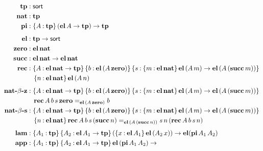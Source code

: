 \documentclass[11pt,twoside]{article}
\newcommand{\braces}[1]{\{#1\}}
\newcommand{\parens}[1]{(#1)}
\newcommand{\sortclass}{\ensuremath{\textsf{sort}}}
\newcommand{\eqclass}[3]{{#2}=_{#1}{#3}}
\newcommand{\piclass}[3]{\braces{{#2}\mathbin{:}{#1}}\,{#3}}
\newcommand{\arrclass}[2]{{#1}\to{#2}}
\newcommand{\appobj}[2]{{#1}\,{#2}}
\begin{document}
\begin{figure}
  
  \begin{align*}
    \tpsort
    & : \sortclass \\
    \nattp
    & : \tpsort \\
    \pitp
    & : \piclass{\tpsort}{A}{\arrclass{\parens{\arrclass{\elof{A}}{\tpsort}}}{\tpsort}} \\[1ex]
%
    \elfam 
    & : \arrclass{\tpsort}{\sortclass} \\
    \zerocon
    & : \elof{\nattp} \\
    \succcon
    & : \arrclass {\elof{\nattp}}{\elof{\nattp}} \\
    \reccon
    &  :
      \piclass{\arrclass{\elof{\nattp}}{\tpsort}}{A}{
      \piclass{\elofp{\appobj{A}{\zerocon}}}{b}{
      \piclass{\piclass{\elof{\nattp}}{m}{\arrclass{\elofp{\appobj{A}{m}}}{\elofp{\appobj{A}{\parens{\succof{m}}}}}}}{s}{
      }}} \\
    & \quad
      \piclass{\elof{\nattp}}{n}{\elofp{\appobj{A}{n}}} \\[1ex] 
%
    \natbetaz
    & :
      \piclass{\arrclass{\elof{\nattp}}{\tpsort}}{A}{
      \piclass{\elofp{\appobj{A}{\zerocon}}}{b}{
      \piclass{\piclass{\elof{\nattp}}{m}{\arrclass{\elofp{\appobj{A}{m}}}{\elofp{\appobj{A}{\parens{\succof{m}}}}}}}{s}{
      }}} \\
    & \quad
      \eqclass{\elofp{\appobj{A}{\zerocon}}}{\recof{A}{b}{s}{\zerocon}}{b} \\
%
    \natbetas
    & :
      \piclass{\arrclass{\elof{\nattp}}{\tpsort}}{A}{
      \piclass{\elofp{\appobj{A}{\zerocon}}}{b}{
      \piclass{\piclass{\elof{\nattp}}{m}{\arrclass{\elofp{\appobj{A}{m}}}{\elofp{\appobj{A}{\parens{\succof{m}}}}}}}{s}{
      }}} \\
    & \quad
      \piclass{\elof{\nattp}}{n}{
      \eqclass{\elofp{\appobj{A}{\parens{\succof{n}}}}}
      {\recof{A}{b}{s}{\parens{\succof{n}}}}
      {\appobj{\appobj{s}{n}}{\parens{\recof{A}{b}{s}{n}}}}} \\[1ex]
%
    \lamcon
    & :
      \piclass{\tpsort}{A_{1}}{
      \piclass{\arrclass{\elof{A_{1}}}{\tpsort}}{A_{2}}{
      \arrclass{\parens{\piclass{\elof{A_{1}}}{x}{\elofp{\appobj{A_{2}}{x}}}}}{
      \elfam{\parens{\piof{A_{1}}{A_{2}}}}}}} \\
    \appcon
    & :
      \piclass{\tpsort}{A_{1}}{
      \piclass{\arrclass{\elof{A_{1}}}{\tpsort}}{A_{2}}{
      \arrclass{\elofp{\piof{A_{1}}{A_{2}}}}{
}}}
\end{align*}
\end{figure}
\end{document}
